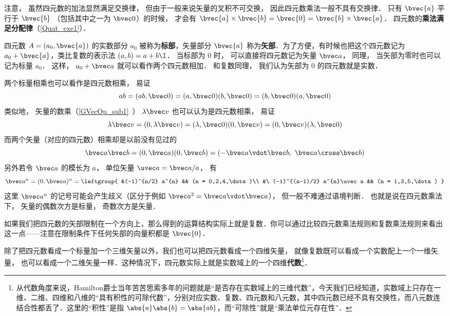 注意， 虽然四元数的加法显然满足交换律， 但由于一般来说矢量的叉积不可交换， 因此四元数乘法一般不具有交换律． 只有 $\bvec{a}$ 平行于 $\bvec{b}$ （包括其中之一为 $\bvec 0$）的时候， 才会有 $\bvec{a}\times\bvec{b}= \bvec{0} =\bvec{b}\times\bvec{a}$． 四元数的\textbf{乘法满足分配律}（\autoref{Quat_exe1}）．

四元数 $A=(a_0, \bvec{a})$ 的实数部分 $a_0$ 被称为\textbf{标部}，矢量部分 $\bvec{a}$ 称为\textbf{矢部}．为了方便，有时候也把这个四元数记为 $a_0+\bvec{a}$，类比复数的表示法 $(a, b)=a+b\I$． 当标部为 $0$ 时， 可以直接将四元数记为矢量 $\bvec a$， 同理， 当矢部为零时也可以记为标量 $a_0$． 这样， $a_0 + \bvec a$ 就可以看作两个四元数相加． 和复数同理， 我们认为矢部为 $0$ 的四元数就是实数．

\begin{example}{}
两个标量相乘也可以看作是四元数相乘， 易证
\begin{equation}
ab = (ab, \bvec 0) = (a,\bvec 0)(b,\bvec 0) = (b,\bvec 0)(a,\bvec 0)
\end{equation}
类似地， 矢量的数乘（\autoref{GVecOp_sub1}~） $\lambda\bvec v$ 也可以认为是四元数相乘， 易证
\begin{equation}
\lambda\bvec v = (0, \lambda\bvec v) = (\lambda, \bvec 0)(0, \bvec v) = (0, \bvec v)(\lambda, \bvec 0)
\end{equation}
而两个矢量（对应的四元数）相乘却是以前没有见过的
\begin{equation}
\bvec a\bvec b = (0, \bvec a)(0, \bvec b) = (-\bvec a\vdot\bvec b,\ \bvec a\cross\bvec b)
\end{equation}
另外若令 $\bvec a$ 的模长为 $a$， 单位矢量 $\uvec a = \bvec a/a$， 有
\begin{equation}
\bvec a^{n} = (0, \bvec a)^{n} =
\leftgroup{
&(-1)^{n/2} a^{n} && (n = 0,2,4,\dots)\\
&\ (-1)^{(n-1)/2} a^{n}\uvec a && (n = 1,3,5,\dots)
}
\end{equation}
这里 $\bvec a^{n}$ 的记号可能会产生歧义（区分于例如 $\bvec a^2 = \bvec a\vdot\bvec a$）， 但一般不难通过语境判断． 也就是说在四元数乘法下， 矢量的偶数次方是标量， 奇数次方是矢量．
\end{example}

如果我们把四元数的矢部限制在一个方向上，那么得到的运算结构实际上就是复数．你可以通过比较四元数乘法规则和复数乘法规则来看出这一点——注意在限制条件下任何矢部的向量积都是 $\bvec{0}$．

除了把四元数看成一个标量加一个三维矢量以外，我们也可以把四元数看成一个四维矢量， 就像复数既可以看成一个实数配上一个一维矢量， 也可以看成一个二维矢量一样．这种情况下，四元数实际上就是实数域上的一个四维\textbf{代数}\footnote{从代数角度来说，Hamilton爵士当年苦苦思索多年的问题就是“是否存在实数域上的三维代数”，今天我们已经知道，实数域上只存在一维、二维、四维和八维的“具有积性的可除代数”，分别对应实数、复数、四元数和八元数，其中四元数已经不具有交换性，而八元数连结合性都丢了．这里的“积性”是指 $\abs{a}\abs{b}=\abs{ab}$，而“可除性”就是“乘法单位元存在性”．}．

